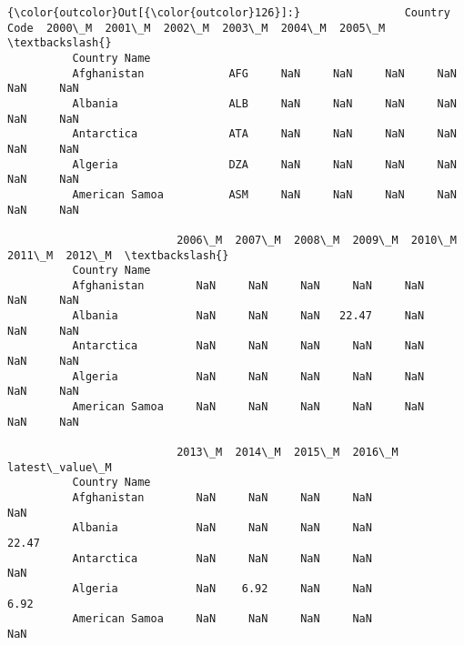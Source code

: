 \documentclass[11pt]{article}
\begin{document}
\begin{Verbatim}[commandchars=\\\{\}]
{\color{outcolor}Out[{\color{outcolor}126}]:}                Country Code  2000\_M  2001\_M  2002\_M  2003\_M  2004\_M  2005\_M  \textbackslash{}
          Country Name                                                                  
          Afghanistan             AFG     NaN     NaN     NaN     NaN     NaN     NaN   
          Albania                 ALB     NaN     NaN     NaN     NaN     NaN     NaN   
          Antarctica              ATA     NaN     NaN     NaN     NaN     NaN     NaN   
          Algeria                 DZA     NaN     NaN     NaN     NaN     NaN     NaN   
          American Samoa          ASM     NaN     NaN     NaN     NaN     NaN     NaN   
          
                          2006\_M  2007\_M  2008\_M  2009\_M  2010\_M  2011\_M  2012\_M  \textbackslash{}
          Country Name                                                             
          Afghanistan        NaN     NaN     NaN     NaN     NaN     NaN     NaN   
          Albania            NaN     NaN     NaN   22.47     NaN     NaN     NaN   
          Antarctica         NaN     NaN     NaN     NaN     NaN     NaN     NaN   
          Algeria            NaN     NaN     NaN     NaN     NaN     NaN     NaN   
          American Samoa     NaN     NaN     NaN     NaN     NaN     NaN     NaN   
          
                          2013\_M  2014\_M  2015\_M  2016\_M  latest\_value\_M  
          Country Name                                                    
          Afghanistan        NaN     NaN     NaN     NaN             NaN  
          Albania            NaN     NaN     NaN     NaN           22.47  
          Antarctica         NaN     NaN     NaN     NaN             NaN  
          Algeria            NaN    6.92     NaN     NaN            6.92  
          American Samoa     NaN     NaN     NaN     NaN             NaN  
\end{Verbatim}
            
\end{document}

